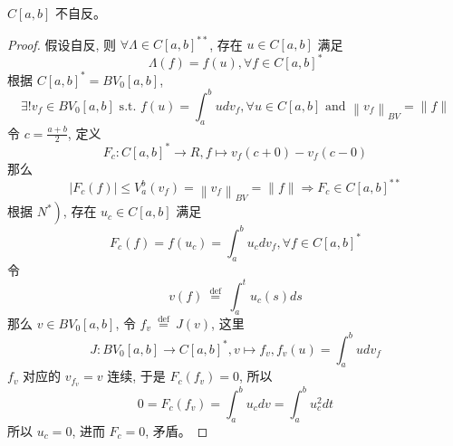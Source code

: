 \documentclass[lang=cn,newtx,10pt,scheme=chinese,thmcnt=chapter]{elegantbook}
\begin{document}
\begin{theorem}
$C[a, b]$ 不自反。


\end{theorem}
\begin{proof}
假设自反, 则 $\forall \Lambda \in C[a, b]^{* *}$, 存在 $u \in C[a, b]$ 满足
\begin{equation*}
\Lambda(f)=f(u), \forall f \in C[a, b]^*
\end{equation*}
根据 $C[a, b]^*=B V_0[a, b]$,
\begin{equation*}
\exists!v_f \in B V_0[a, b] \text { s.t. } f(u)=\int_a^b u d v_f, \forall u \in C[a, b] \text { and }\left\|v_f\right\|_{B V}=\|f\|
\end{equation*}
令 $c=\frac{a+b}{2}$, 定义
\begin{equation*}
F_c: C[a, b]^* \rightarrow R , f \mapsto v_f(c+0)-v_f(c-0)
\end{equation*}
那么
\begin{equation*}
\left|F_c(f)\right| \leqslant V_a^b\left(v_f\right)=\left\|v_f\right\|_{B V}=\|f\| \Rightarrow F_c \in C[a, b]^{* *}
\end{equation*}
根据 $\left.N ^*\right)$, 存在 $u_c \in C[a, b]$ 满足
\begin{equation*}
F_c(f)=f\left(u_c\right)=\int_a^b u_c d v_f, \forall f \in C[a, b]^*
\end{equation*}
令
\begin{equation*}
v(f) \stackrel{\text { def }}{=} \int_a^t u_c(s) d s
\end{equation*}
那么 $v \in B V_0[a, b]$, 令 $f_v \stackrel{\text { def }}{=} J(v)$, 这里
\begin{equation*}
J: B V_0[a, b] \rightarrow C[a, b]^*, v \mapsto f_v, f_v(u)=\int_a^b u d v_f
\end{equation*}
$f_v$ 对应的 $v_{f_v}=v$ 连续, 于是 $F_c\left(f_v\right)=0$, 所以
\begin{equation*}
0=F_c\left(f_v\right)=\int_a^b u_c d v=\int_a^b u_c^2 d t
\end{equation*}
所以 $u_c=0$, 进而 $F_c=0$, 矛盾。
\end{proof}
\end{document}
